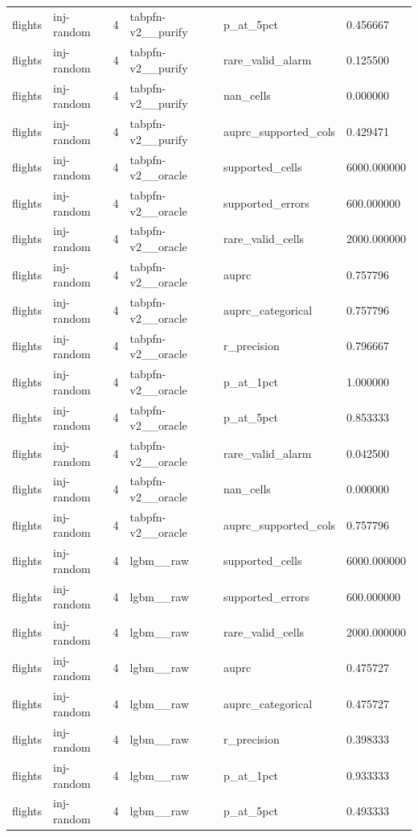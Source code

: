 \begin{tabular}{llllll}
flights & inj-random & 4 & tabpfn-v2\_\_purify & p\_at\_5pct & 0.456667 \\
flights & inj-random & 4 & tabpfn-v2\_\_purify & rare\_valid\_alarm & 0.125500 \\
flights & inj-random & 4 & tabpfn-v2\_\_purify & nan\_cells & 0.000000 \\
flights & inj-random & 4 & tabpfn-v2\_\_purify & auprc\_supported\_cols & 0.429471 \\
flights & inj-random & 4 & tabpfn-v2\_\_oracle & supported\_cells & 6000.000000 \\
flights & inj-random & 4 & tabpfn-v2\_\_oracle & supported\_errors & 600.000000 \\
flights & inj-random & 4 & tabpfn-v2\_\_oracle & rare\_valid\_cells & 2000.000000 \\
flights & inj-random & 4 & tabpfn-v2\_\_oracle & auprc & 0.757796 \\
flights & inj-random & 4 & tabpfn-v2\_\_oracle & auprc\_categorical & 0.757796 \\
flights & inj-random & 4 & tabpfn-v2\_\_oracle & r\_precision & 0.796667 \\
flights & inj-random & 4 & tabpfn-v2\_\_oracle & p\_at\_1pct & 1.000000 \\
flights & inj-random & 4 & tabpfn-v2\_\_oracle & p\_at\_5pct & 0.853333 \\
flights & inj-random & 4 & tabpfn-v2\_\_oracle & rare\_valid\_alarm & 0.042500 \\
flights & inj-random & 4 & tabpfn-v2\_\_oracle & nan\_cells & 0.000000 \\
flights & inj-random & 4 & tabpfn-v2\_\_oracle & auprc\_supported\_cols & 0.757796 \\
flights & inj-random & 4 & lgbm\_\_raw & supported\_cells & 6000.000000 \\
flights & inj-random & 4 & lgbm\_\_raw & supported\_errors & 600.000000 \\
flights & inj-random & 4 & lgbm\_\_raw & rare\_valid\_cells & 2000.000000 \\
flights & inj-random & 4 & lgbm\_\_raw & auprc & 0.475727 \\
flights & inj-random & 4 & lgbm\_\_raw & auprc\_categorical & 0.475727 \\
flights & inj-random & 4 & lgbm\_\_raw & r\_precision & 0.398333 \\
flights & inj-random & 4 & lgbm\_\_raw & p\_at\_1pct & 0.933333 \\
flights & inj-random & 4 & lgbm\_\_raw & p\_at\_5pct & 0.493333 \\

\end{tabular}
